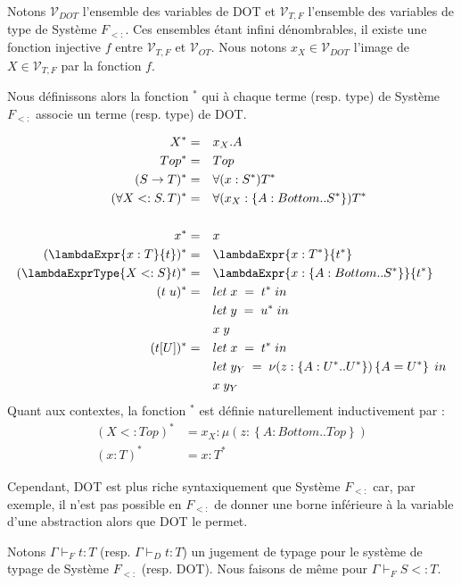 Notons $\mathcal{V}_{DOT}$ l'ensemble des variables de DOT et $\mathcal{V}_{T,
  F}$ l'ensemble des variables de type de Système $F_{<:}$. Ces ensembles 
étant infini dénombrables, il existe une fonction injective $f$ entre
$\mathcal{V}_{T, F}$ et $\mathcal{V}_{OT}$. Nous notons $x_{X} \in
\mathcal{V}_{DOT}$ l'image de $X \in \mathcal{V}_{T, F}$ par la fonction $f$.

Nous définissons alors la fonction ${}^{*}$ qui à chaque terme (resp. type) de
Système $F_{<:}$ associe un terme (resp. type) de DOT.

\begin{align*}
  X^{*} & = && x_{X}.A \\
  Top^{*} & = && Top \\
  (S \rightarrow T)^{*} & = && \forall(x : S^{*}) T^{*} \\
  (\forall X <: S . \, T)^{*} & = && \forall(x_{X} : \left\{ A : Bottom .. S^{*} \right\}) T^{*} \\ \\
  x^{*} & = && x \\
  (\lambdaExpr{x : T}{t})^{*} & = && \lambdaExpr{x : T^{*}}{t^{*}} \\
  (\lambdaExprType{X <: S}t)^{*} & = && \lambdaExpr{x : \left\{ A : Bottom .. S^{*} \right\}}{t^{*}} \\
  (t \; u)^{*} & = && let \; x \; = \; t^{*} \; in \\
              &  && let \; y \; = \; u^{*} \; in \\
              &  && x \; y \\
   (t[U])^{*}  & = && let \; x \; = \; t^{*} \; in \\
              &  && let \; y_{Y} \; = \; \nu(z : \left\{ A : U^{*} .. U^{*} \right\}) \left\{ A = U^{*} \right\} \; in \\
              &  && x \; y_{Y}
\end{align*}
Quant aux contextes, la fonction ${}^{*}$ est définie naturellement
inductivement par :
\begin{align*}
  (X <: Top)^{*} & = x_{X} : \mu(z : \left\{ A : Bottom .. Top \right\}) \\
  (x : T)^{*} & = x : T^{*}
\end{align*}

Cependant, DOT est plus riche syntaxiquement que Système $F_{<:}$ car, par
exemple, il n'est pas possible en $F_{<:}$ de donner une borne inférieure à la
variable d'une abstraction alors que DOT le permet.


Notons $\Gamma \vdash_{F} t : T$ (resp. $\Gamma \vdash_{D} t : T$) un jugement
de typage pour le système de typage de Système $F_{<:}$ (resp. DOT). Nous faisons
de même pour $\Gamma \vdash_{F} S <: T$.

